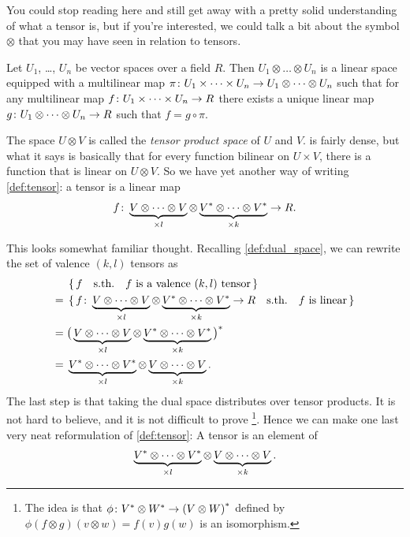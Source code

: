 \documentclass[english, 12pt]{article}
\begin{document}
You could stop reading here and still get away with a pretty solid understanding of what a tensor is, but if you're interested, we could talk a bit about the symbol \(\otimes\) that you may have seen in relation to tensors.

\begin{definition}\label{def:tensor_product}
	Let \(U_1\), \dots, \(U_n\) be vector spaces over a field \(R\).
	Then \(U_1 \otimes \dots \otimes U_n\) is a linear space equipped with a multilinear map \(\pi \colon U_1 \times \dots \times U_n \to U_1 \otimes \dots \otimes U_n\) such that for any multilinear map \(f \colon U_1 \times \dots \times U_n \to R\) there exists a unique linear map \(g \colon U_1 \otimes \dots \otimes U_n \to R\) such that \(f = g \circ \pi\).
\end{definition}

The space \(U \otimes V\) is called the \emph{tensor product space} of \(U\) and \(V\).
 is fairly dense, but what it says is basically that for every function bilinear on \(U \times V\), there is a function that is linear on \(U \otimes V\).
So we have yet another way of writing \cref{def:tensor}: a tensor is a linear map
\begin{align*}
	f \colon \underbrace{V \otimes \dots \otimes V}_{\times l} \otimes \underbrace{{V}^{\ast} \otimes \dots \otimes {V}^{\ast}}_{\times k} \to R.
\end{align*}

This looks somewhat familiar thought.
Recalling \cref{def:dual_space}, we can rewrite the set of valence \((k, l)\) tensors as
\begin{align*}
	&\set{f \quad \textrm{s.th.} \quad f \textrm{ is a valence \((k, l)\) tensor}}\\
	={}& \set{f \colon\underbrace{V \otimes \dots \otimes V}_{\times l} \otimes \underbrace{{V}^{\ast} \otimes \dots \otimes {V}^{\ast}}_{\times k} \to R \quad \textrm{s.th.} \quad f \text{ is linear}}\\
	={}& {\big( \underbrace{V \otimes \dots \otimes V}_{\times l} \otimes \underbrace{{V}^{\ast} \otimes \dots \otimes {V}^{\ast}}_{\times k} \big)}^{\ast}\\
	={}& \underbrace{{V}^{\ast} \otimes \dots \otimes {V}^{\ast}}_{\times l} \otimes \underbrace{V \otimes \dots \otimes V}_{\times k}.
\end{align*}
The last step is that taking the dual space distributes over tensor products.
It is not hard to believe, and it is not difficult to prove%
\footnote{%
	The idea is that \(\phi \colon {V}^{\ast} \otimes {W}^{\ast} \to {(V \otimes W)}^{\ast}\) defined by \(\phi(f \otimes g)(v \otimes w) = f(v) g(w)\) is an isomorphism.
}.
Hence we can make one last very neat reformulation of \cref{def:tensor}: A tensor is an element of
\begin{align*}
	\underbrace{{V}^{\ast} \otimes \dots \otimes {V}^{\ast}}_{\times l} \otimes \underbrace{V \otimes \dots \otimes V}_{\times k}.
\end{align*}
\end{document}
